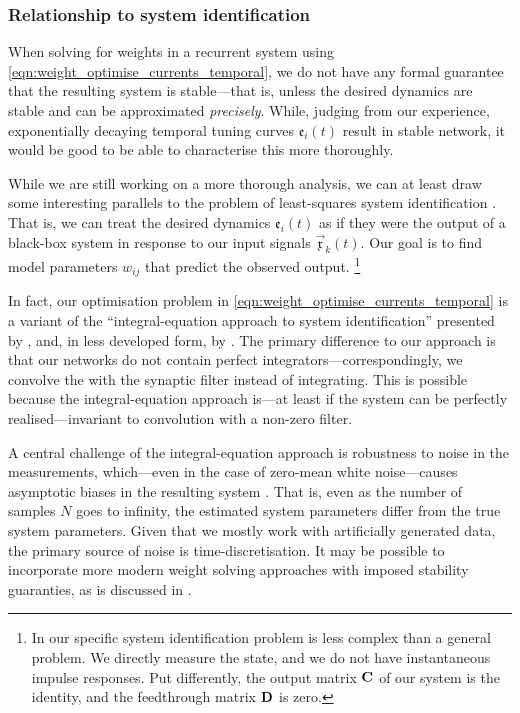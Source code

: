 \subsubsection{Relationship to system identification}
When solving for weights in a recurrent system using \cref{eqn:weight_optimise_currents_temporal}, we do not have any formal guarantee that the resulting system is stable---that is, unless the desired dynamics are stable and can be approximated \emph{precisely}.
While, judging from our experience, exponentially decaying temporal tuning curves $\mathfrak{e}_i(t)$ result in stable network, it would be good to be able to characterise this more thoroughly.

While we are still working on a more thorough analysis, we can at least draw some interesting parallels to the problem of least-squares system identification \citep[cf.][specifically Chapters~7-10]{verhaegen2007filtering}.
That is, we can treat the desired dynamics $\mathfrak{e}_i(t)$ as if they were the output of a black-box system in response to our input signals $\vec{\mathfrak{x}}_k(t)$.
Our goal is to find model parameters $w_{ij}$ that predict the observed output.%
\footnote{In our specific system identification problem is less complex than a general problem.
We directly measure the state, and we do not have instantaneous impulse responses.
Put differently, the output matrix $\mathbf{C}$ of our \LTI system is the identity, and the feedthrough matrix $\mathbf{D}$ is zero.}

In fact, our optimisation problem in \cref{eqn:weight_optimise_currents_temporal} is a variant of the \enquote{integral-equation approach to system identification} presented by \citet{whitfield1987integralequation}, and, in less developed form, by \citet{squire1971simple}.
The primary difference to our approach is that our networks do not contain perfect integrators---correspondingly, we convolve the with the synaptic filter instead of integrating.
This is possible because the integral-equation approach is---at least if the system can be perfectly realised---invariant to convolution with a non-zero filter.

A central challenge of the integral-equation approach is robustness to noise in the measurements, which---even in the case of zero-mean white noise---causes asymptotic biases in the resulting system \citep{sagara1989recursive}.
That is, even as the number of samples $N$ goes to infinity, the estimated system parameters differ from the true system parameters.
Given that we mostly work with artificially generated data, the primary source of noise is time-discretisation.
It may be possible to incorporate more modern weight solving approaches with imposed stability guaranties, as is discussed in \citet{verhaegen2007filtering}.

